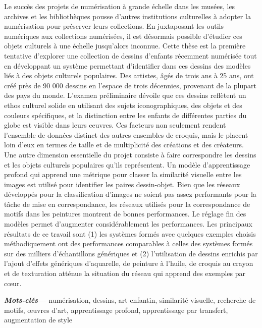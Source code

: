 \documentclass[a4paper,11pt,oneside]{report}
\providecommand{\keywordsfrench}[1]{\textbf{\textit{Mots-clés---}} #1}
\begin{document}
\begin{frenchabstract}
Le succès des projets de numérisation à grande échelle dans les musées, les archives et les bibliothèques pousse d'autres institutions culturelles à adopter la numérisation pour préserver leurs collections. En juxtaposant les outils numériques aux collections numérisées, il est désormais possible d'étudier ces objets culturels à une échelle jusqu'alors inconnue. Cette thèse est la première tentative d'explorer une collection de dessins d'enfants récemment numérisée tout en développant un système permettant d'identifier dans ces dessins des modèles liés à des objets culturels populaires. Des artistes, âgés de trois ans à 25 ans, ont créé près de 90 000 dessins en l'espace de trois décennies, provenant de la plupart des pays du monde. L'examen préliminaire dévoile que ces dessins reflètent un ethos culturel solide en utilisant des sujets iconographiques, des objets et des couleurs spécifiques, et la distinction entre les enfants de différentes parties du globe est visible dans leurs ceuvres. Ces facteurs non seulement rendent l'ensemble de données distinct des autres ensembles de croquis, mais le placent loin d'eux en termes de taille et de multiplicité des créations et des créateurs. Une autre dimension essentielle du projet consiste à faire correspondre les dessins et les objets culturels populaires qu'ils représentent. Un modèle d'apprentissage profond qui apprend une métrique pour classer la similarité visuelle entre les images est utilisé pour identifier les paires dessin-objet. Bien que les réseaux développés pour la classification d'images ne soient pas assez performants pour la tâche de mise en correspondance, les réseaux utilisés pour la correspondance de motifs dans les peintures montrent de bonnes performances. Le réglage fin des modèles permet d'augmenter considérablement les performances. Les principaux résultats de ce travail sont (1) les systèmes formés avec quelques exemples choisis méthodiquement ont des performances comparables à celles des systèmes formés sur des milliers d'échantillons génériques et (2) l'utilisation de dessins enrichis par l'ajout d'effets génériques d'aquarelle, de peinture à l'huile, de croquis au crayon et de texturation atténue la situation du réseau qui apprend des exemples par cœur.
\end{frenchabstract}

\vspace{1em}

\keywordsfrench{numérisation, dessins, art enfantin, similarité visuelle, recherche de motifs, œuvres d'art, apprentissage profond, apprentissage par transfert, augmentation de style}
\end{document}
